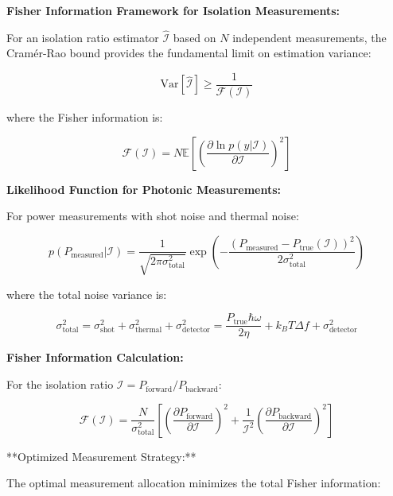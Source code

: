 \documentclass[11pt]{article}
\begin{document}
\textbf{Fisher Information Framework for Isolation Measurements:}

For an isolation ratio estimator $\hat{\mathcal{I}}$ based on $N$ independent measurements, the Cramér-Rao bound provides the fundamental limit on estimation variance:

\begin{equation}
\text{Var}[\hat{\mathcal{I}}] \geq \frac{1}{\mathcal{F}(\mathcal{I})}
\end{equation}

where the Fisher information is:

\begin{equation}
\mathcal{F}(\mathcal{I}) = N \mathbb{E}\left[\left(\frac{\partial \ln p(y|\mathcal{I})}{\partial \mathcal{I}}\right)^2\right]
\end{equation}

\textbf{Likelihood Function for Photonic Measurements:}

For power measurements with shot noise and thermal noise:

\begin{equation}
p(P_{\text{measured}}|\mathcal{I}) = \frac{1}{\sqrt{2\pi\sigma_{\text{total}}^2}} \exp\left(-\frac{(P_{\text{measured}} - P_{\text{true}}(\mathcal{I}))^2}{2\sigma_{\text{total}}^2}\right)
\end{equation}

where the total noise variance is:

\begin{equation}
\sigma_{\text{total}}^2 = \sigma_{\text{shot}}^2 + \sigma_{\text{thermal}}^2 + \sigma_{\text{detector}}^2 = \frac{P_{\text{true}} \hbar\omega}{2\eta} + k_B T \Delta f + \sigma_{\text{detector}}^2
\end{equation}

\textbf{Fisher Information Calculation:}

For the isolation ratio $\mathcal{I} = P_{\text{forward}}/P_{\text{backward}}$:

\begin{equation}
\mathcal{F}(\mathcal{I}) = \frac{N}{\sigma_{\text{total}}^2} \left[\left(\frac{\partial P_{\text{forward}}}{\partial \mathcal{I}}\right)^2 + \frac{1}{\mathcal{I}^2}\left(\frac{\partial P_{\text{backward}}}{\partial \mathcal{I}}\right)^2\right]
\end{equation}

**Optimized Measurement Strategy:**

The optimal measurement allocation minimizes the total Fisher information:
\end{document}
